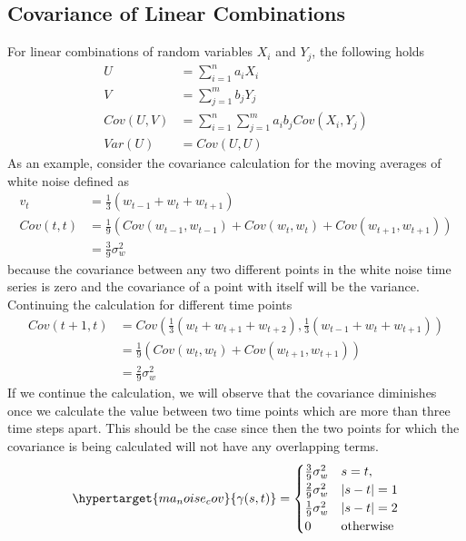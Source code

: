 \documentclass[../time_series_notes.tex]{subfiles}
\begin{document}
    \subsection{Covariance of Linear Combinations}
    For linear combinations of random variables $X_{i}$ and $Y_{j}$, the following holds
    \begin{align*}
        U &= \sum_{i=1}^{n} a_{i} X_{i}\\
        V &= \sum_{j=1}^{m} b_{j} Y_{j}\\
        Cov(U,V) &= \sum_{i=1}^{n} \sum_{j=1}^{m} a_{i} b_{j} Cov(X_{i}, Y_{j})\\
        Var(U) &= Cov(U,U)
    \end{align*}
    As an example, consider the covariance calculation for the moving averages of white noise defined as
    \begin{align*}
        v_{t} &= \frac{1}{3}(w_{t-1} + w_{t} + w_{t+1})\\
        Cov(t, t) &= \frac{1}{9}(Cov(w_{t-1}, w_{t-1}) + Cov(w_{t}, w_{t}) + Cov(w_{t+1}, w_{t+1}))\\
        &= \frac{3}{9} \sigma_{w}^{2}
    \end{align*}
    because the covariance between any two different points in the white noise time series is zero and the covariance of a point with itself will be the variance.\newline
    Continuing the calculation for different time points
    \begin{align*}
        Cov(t+1, t) &= Cov(\frac{1}{3}(w_{t} + w_{t+1} + w_{t+2}), \frac{1}{3}(w_{t-1} + w_{t} + w_{t+1}))\\
        &= \frac{1}{9}(Cov(w_{t}, w_{t}) + Cov(w_{t+1}, w_{t+1}))\\
        &= \frac{2}{9}\sigma_{w}^{2}
    \end{align*}
    If we continue the calculation, we will observe that the covariance diminishes once we calculate the value between two time points which are more than three time steps apart. This should be the case since then the two points for which the covariance is being calculated will not have any overlapping terms.
    \begin{align*}
        \hypertarget{ma_noise_cov}{\gamma(s,t)} = \begin{cases} \frac{3}{9}\sigma_{w}^{2} &\mbox{$s = t$},\\
                                    \frac{2}{9}\sigma_{w}^{2} &\mbox{$\lvert s - t \rvert = 1$}\\
                                    \frac{1}{9}\sigma_{w}^{2} &\mbox{$\lvert s - t \rvert = 2$}\\
                                    0 &\mbox{otherwise} \end{cases}
    \end{align*}
\end{document}

